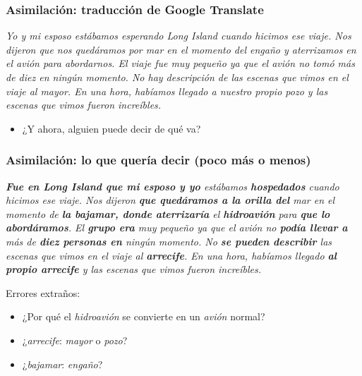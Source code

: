 \documentclass{beamer}
\newcommand{\empha}[1]{\emph{#1}\/}
\begin{document}
\begin{frame}
  \frametitle{Asimilación: traducción de Google Translate}

  \empha{Yo y mi esposo estábamos esperando Long Island cuando hicimos ese viaje. Nos dijeron que nos quedáramos por mar en el momento del engaño y aterrizamos en el avión para abordarnos. El viaje fue muy pequeño ya que el avión no tomó más de diez en ningún momento. No hay descripción de las escenas que vimos en el viaje al mayor. En una hora, habíamos llegado a nuestro propio pozo y las escenas que vimos fueron increíbles.}
\begin{itemize}
\item ¿Y ahora, alguien puede decir de qué va?
\end{itemize}

\end{frame}
\begin{frame}
  \frametitle{Asimilación: lo que quería decir (poco más o menos)}

\empha{\textbf{Fue en Long Island que mi esposo y yo} estábamos \textbf{hospedados} cuando hicimos ese viaje. Nos dijeron \textbf{que quedáramos a la orilla del} mar en el momento de \textbf{la bajamar, donde aterrizaría}  el \textbf{hidroavión} para \textbf{que lo abordáramos}. El \textbf{grupo era} muy pequeño ya que el avión no \textbf{podía llevar a} más de \textbf{diez personas en} ningún momento. No \textbf{se pueden describir} las escenas que vimos en el viaje al \textbf{arrecife}. En una hora, habíamos llegado \textbf{al propio arrecife} y las escenas que vimos fueron increíbles.}

Errores extraños:
\begin{itemize}
\item ¿Por qué el \empha{hidroavión} se convierte en un \empha{avión} normal?
\item ¿\empha{arrecife}:  \empha{mayor} o \empha{pozo}?
\item ¿\empha{bajamar}: \empha{engaño}?
\end{itemize}

\end{frame}


\end{document}

